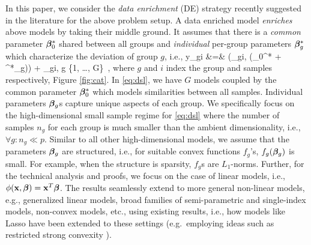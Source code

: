 In this paper, we consider the \emph{data enrichment} (DE) strategy recently suggested in the literature \cite{domu16, grti16,  olvi14, olvi15} for the above problem setup. 
A data enriched model \emph{enriches} above models by taking their middle ground. It assumes that there is a \emph{common} parameter $\boldsymbol{\beta}^*_0$ shared between all groups and \emph{individual} per-group parameters $\boldsymbol{\beta}_g^*$ which characterize the deviation of group $g$, i.e.,
\be
\label{eq:dsl}
y_{gi} &=& \phi(\x_{gi}, (\bbeta_0^* + \bbeta^*_g)) + \omega_{gi}, \quad g \in \{1, \dots, G\}~,
\ee
where $g$ and $i$ index the group and samples respectively, Figure \ref{fig:cat}. 
In \eqref{eq:dsl}, we have $G$ 
models coupled by the common parameter $\boldsymbol{\beta}^*_0$ which models similarities between all samples. Individual parameters $\boldsymbol{\beta}_g$s capture unique aspects of each group.
We specifically focus on the high-dimensional small sample regime for \eqref{eq:dsl} where the number of samples $n_g$ for each group is much smaller than the ambient 
dimensionality, i.e., $\forall g: n_g \ll p$. Similar to all other high-dimensional models, we assume that the parameters $\boldsymbol{\beta}_g$ are structured, i.e., for suitable convex functions $f_g$'s, $f_g(\boldsymbol{\beta}_g)$ is small.
For example, when the structure is sparsity, $f_g$s are $L_1$-norms. Further, for the technical analysis and proofs,
we focus on the case of linear models, i.e., $\phi(\mathbf{x},\boldsymbol{\beta}) = \mathbf{x}^T \boldsymbol{\beta}$. The results
seamlessly extend to more general non-linear models, e.g., generalized linear models, broad families of semi-parametric and single-index models, non-convex models, etc., using
existing results, i.e., how models like Lasso have been extended to these settings (e.g.~employing ideas such as restricted strong convexity \cite{negahban2012restricted}). %



